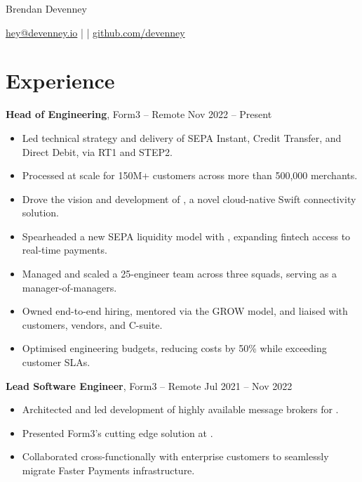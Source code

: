 \documentclass[11pt]{article}       %
\begin{document}
\centerline{\Huge Brendan Devenney}

\vspace{5pt}

\centerline{\href{mailto:hey@devenney.io}{hey@devenney.io} | \additionalcontact{} | \href{https://github.com/devenney}{github.com/devenney}}

\vspace{-10pt}

\section*{Experience}

\textbf{Head of Engineering}, Form3 -- Remote \hfill Nov 2022 -- Present \\
\vspace{-9pt}
\begin{itemize}
  \item Led technical strategy and delivery of SEPA Instant, Credit Transfer, and Direct Debit, via RT1 and STEP2. \\
  \item Processed  at scale for 150M+ customers across more than 500,000 merchants. \\
  \item Drove the vision and development of , a novel cloud-native Swift connectivity solution. \\
  \item Spearheaded a new SEPA liquidity model with , expanding fintech access to real-time payments. \\
  \item Managed and scaled a 25-engineer team across three squads, serving as a manager-of-managers. \\
  \item Owned end-to-end hiring, mentored via the GROW model, and liaised with customers, vendors, and C-suite. \\
  \item Optimised engineering budgets, reducing costs by 50\% while exceeding customer SLAs. \\
\end{itemize}

\textbf{Lead Software Engineer}, Form3 -- Remote \hfill Jul 2021 -- Nov 2022 \\
\vspace{-9pt}
\begin{itemize}
  \item Architected and led development of highly available message brokers for . \\
  \item Presented Form3's cutting edge solution at . \\
  \item Collaborated cross-functionally with enterprise customers to seamlessly migrate Faster Payments infrastructure. \\
\end{itemize}
\end{document}
